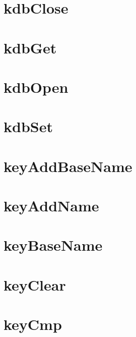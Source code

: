 \let\mypdfximage\pdfximage\def\pdfximage{\immediate\mypdfximage}\documentclass[twoside]{book}
\newcommand{\+}{\discretionary{\mbox{\scriptsize$\hookleftarrow$}}{}{}}
\begin{document}
\chapter{kdb\+Close}
\label{doc_api_review_core_kdbClose_md}

\chapter{kdb\+Get}
\label{doc_api_review_core_kdbGet_md}

\chapter{kdb\+Open}
\label{doc_api_review_core_kdbOpen_md}

\chapter{kdb\+Set}
\label{doc_api_review_core_kdbSet_md}

\chapter{key\+Add\+Base\+Name}
\label{doc_api_review_core_keyAddBaseName_md}

\chapter{key\+Add\+Name}
\label{doc_api_review_core_keyAddName_md}

\chapter{key\+Base\+Name}
\label{doc_api_review_core_keyBaseName_md}

\chapter{key\+Clear}
\label{doc_api_review_core_keyClear_md}

\chapter{key\+Cmp}
\label{doc_api_review_core_keyCmp_md}

\end{document}
